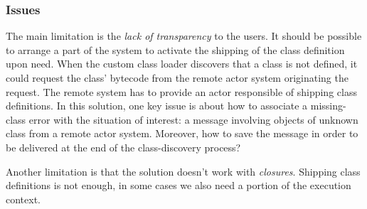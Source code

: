 \documentclass[11pt]{llncs}
\begin{document}
\subsubsection{Issues}

The main limitation is the \emph{lack of transparency} to the users. 
It should be possible to arrange a part of the system to activate the shipping of the class definition upon need. When the custom class loader discovers that a class is not defined, it could request the class' bytecode from the remote actor system originating the request. The remote system has to provide an actor responsible of shipping class definitions. In this solution, one key issue is about how to associate a missing-class error with the situation of interest: a message involving objects of unknown class from a remote actor system. Moreover, how to save the message in order to be delivered at the end of the class-discovery process?

Another limitation is that the solution doesn't work with \emph{closures}.
  Shipping class definitions is not enough, in some cases we also need a portion of the execution context.
 
\end{document}
